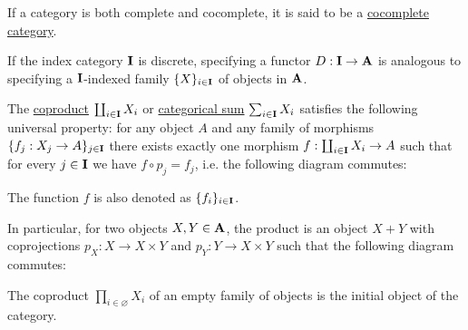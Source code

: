 \begin{definition}\label{def:cocomplete_category}
  If a category is both complete and cocomplete, it is said to be a \uline{cocomplete category}.
\end{definition}

\begin{definition}\label{def:categorical_coproduct}\cite[definition 5.2.2]{Leinster2014}
  If the index category $\operatorname{\mathbf{I}}$ is discrete, specifying a functor $D: \operatorname{\mathbf{I}} \to \operatorname{\mathbf{A}}$ is analogous to specifying a $\operatorname{\mathbf{I}}$-indexed family $\{ X \}_{i \in \operatorname{\mathbf{I}}}$ of objects in $\operatorname{\mathbf{A}}$.

  The \uline{coproduct} $\coprod_{i \in \operatorname{\mathbf{I}}} X_i$ or \uline{categorical sum} $\sum_{i \in \operatorname{\mathbf{I}}} X_i$ satisfies the following universal property: for any object $A$ and any family of morphisms $\{ f_j: {X_j} \to A \}_{j \in \operatorname{\mathbf{I}}}$ there exists exactly one morphism $f: \coprod_{i \in \operatorname{\mathbf{I}}} X_i \to A$ such that for every $j \in \operatorname{\mathbf{I}}$ we have $f \circ p_j = f_j$, i.e. the following diagram commutes:
  \begin{center}
  \end{center}

  The function $f$ is also denoted as $\{ f_i \}_{i \in \operatorname{\mathbf{I}}}$.

  In particular, for two objects $X, Y \in \operatorname{\mathbf{A}}$, the product is an object $X + Y$ with coprojections $p_X: X \to X \times Y$ and $p_Y: Y \to X \times Y$ such that the following diagram commutes:
  \begin{center}
  \end{center}
\end{definition}

\begin{note}\label{note:empty_categorical_coproduct}
  The coproduct $\prod_{i \in \varnothing} X_i$ of an empty family of objects is the initial object of the category.
\end{note}


